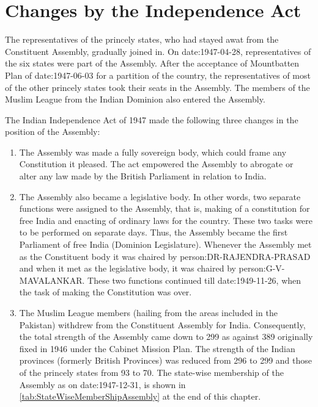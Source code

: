 \section{Changes by the Independence Act}

The representatives of the princely states, who had stayed awat from the Constituent Assembly, gradually joined in. On \gls{date:1947-04-28}, representatives of the six states were part of the Assembly. After the acceptance of Mountbatten Plan of \gls{date:1947-06-03} for a partition of the country, the representatives of most of the other princely states took their seats in the Assembly. The members of the Muslim League from the Indian Dominion also entered the Assembly.

The Indian Independence Act of 1947 made the following three changes in the position of the Assembly:

\begin{enumerate}
  \item The Assembly was made a fully sovereign body, which could frame any Constitution it pleased. The act empowered the Assembly to abrogate or alter any law made by the British Parliament in relation to India.
  \item The Assembly also became a legislative body. In other words, two separate functions were assigned to the Assembly, that is, making of a constitution for free India and enacting of ordinary laws for the country. These two tasks were to be performed on separate days. Thus, the Assembly became the first Parliament of free India (Dominion Legislature). Whenever the Assembly met as the Constituent body it was chaired by \gls{person:DR-RAJENDRA-PRASAD} and when it met as the legislative body, it was chaired by \gls{person:G-V-MAVALANKAR}. These two functions continued till \gls{date:1949-11-26}, when the task of making the Constitution was over.
  \item The Muslim League members (hailing from the areas included in the Pakistan) withdrew from the Constituent Assembly for India. Consequently, the total strength of the Assembly came down to 299 as against 389 originally fixed in 1946 under the Cabinet Mission Plan. The strength of the Indian provinces (formerly British Provinces) was reduced from 296 to 299 and those of the princely states from 93 to 70. The state-wise membership of the Assembly as on \gls{date:1947-12-31}, is shown in \ref{tab:StateWiseMemberShipAssembly} at the end of this chapter.
\end{enumerate}

